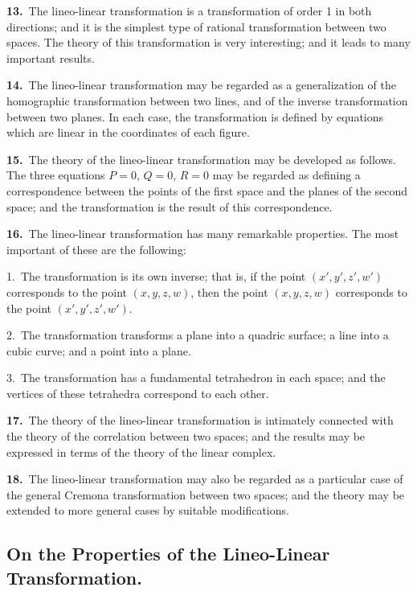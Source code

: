 \documentclass[11pt,a4paper]{article}
\begin{document}
\textbf{13.}\ The lineo-linear transformation is a transformation of order 1 in both directions; and it is the simplest type of rational transformation between two spaces. The theory of this transformation is very interesting; and it leads to many important results.

\textbf{14.}\ The lineo-linear transformation may be regarded as a generalization of the homographic transformation between two lines, and of the inverse transformation between two planes. In each case, the transformation is defined by equations which are linear in the coordinates of each figure.

\newpage
\setcounter{page}{195}

\noindent\textbf{15.}\ The theory of the lineo-linear transformation may be developed as follows. The three equations $P = 0$, $Q = 0$, $R = 0$ may be regarded as defining a correspondence between the points of the first space and the planes of the second space; and the transformation is the result of this correspondence.

\textbf{16.}\ The lineo-linear transformation has many remarkable properties. The most important of these are the following:

1.\ The transformation is its own inverse; that is, if the point $(x', y', z', w')$ corresponds to the point $(x, y, z, w)$, then the point $(x, y, z, w)$ corresponds to the point $(x', y', z', w')$.

2.\ The transformation transforms a plane into a quadric surface; a line into a cubic curve; and a point into a plane.

3.\ The transformation has a fundamental tetrahedron in each space; and the vertices of these tetrahedra correspond to each other.

\textbf{17.}\ The theory of the lineo-linear transformation is intimately connected with the theory of the correlation between two spaces; and the results may be expressed in terms of the theory of the linear complex.

\textbf{18.}\ The lineo-linear transformation may also be regarded as a particular case of the general Cremona transformation between two spaces; and the theory may be extended to more general cases by suitable modifications.

\subsection*{On the Properties of the Lineo-Linear Transformation.}
\end{document}
